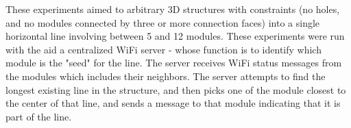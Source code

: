 These experiments aimed to arbitrary 3D structures with constraints (no holes, and no modules connected by three or more connection faces) into a single horizontal line involving between 5 and 12 modules. These experiments were run with the aid a centralized WiFi server - whose function is to identify which module is the "seed" for the line. The server receives WiFi  status messages from the modules which includes their neighbors. The server attempts to find the longest existing line in the structure, and then picks one of the module closest to the center of that line, and sends a message to that module indicating that it is part of the line. 


\begin{figure}[h]  
	\centering
	\begin{subfigure}[b]{0.32\linewidth}
	\end{subfigure}
	\begin{subfigure}[b]{0.32\linewidth}
\end{subfigure}
\end{figure}
